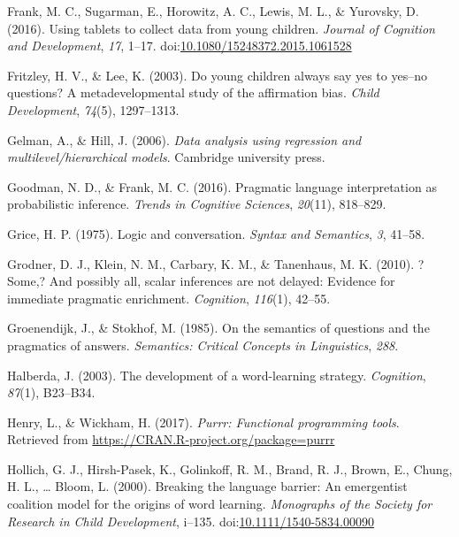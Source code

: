 \documentclass[man]{apa6}
\begin{document}
\hypertarget{ref-frank2016}{}
Frank, M. C., Sugarman, E., Horowitz, A. C., Lewis, M. L., \& Yurovsky,
D. (2016). Using tablets to collect data from young children.
\emph{Journal of Cognition and Development}, \emph{17}, 1--17.
doi:\href{https://doi.org/10.1080/15248372.2015.1061528}{10.1080/15248372.2015.1061528}

\hypertarget{ref-fritzley2003young}{}
Fritzley, H. V., \& Lee, K. (2003). Do young children always say yes to
yes--no questions? A metadevelopmental study of the affirmation bias.
\emph{Child Development}, \emph{74}(5), 1297--1313.

\hypertarget{ref-gelman2006data}{}
Gelman, A., \& Hill, J. (2006). \emph{Data analysis using regression and
multilevel/hierarchical models}. Cambridge university press.

\hypertarget{ref-goodman2016}{}
Goodman, N. D., \& Frank, M. C. (2016). Pragmatic language
interpretation as probabilistic inference. \emph{Trends in Cognitive
Sciences}, \emph{20}(11), 818--829.

\hypertarget{ref-grice1975logic}{}
Grice, H. P. (1975). Logic and conversation. \emph{Syntax and
Semantics}, \emph{3}, 41--58.

\hypertarget{ref-grodner2010}{}
Grodner, D. J., Klein, N. M., Carbary, K. M., \& Tanenhaus, M. K.
(2010). ?Some,? And possibly all, scalar inferences are not delayed:
Evidence for immediate pragmatic enrichment. \emph{Cognition},
\emph{116}(1), 42--55.

\hypertarget{ref-groenendijk1985semantics}{}
Groenendijk, J., \& Stokhof, M. (1985). On the semantics of questions
and the pragmatics of answers. \emph{Semantics: Critical Concepts in
Linguistics}, \emph{288}.

\hypertarget{ref-halberda2003development}{}
Halberda, J. (2003). The development of a word-learning strategy.
\emph{Cognition}, \emph{87}(1), B23--B34.

\hypertarget{ref-R-purrr}{}
Henry, L., \& Wickham, H. (2017). \emph{Purrr: Functional programming
tools}. Retrieved from \url{https://CRAN.R-project.org/package=purrr}

\hypertarget{ref-hollich2000}{}
Hollich, G. J., Hirsh-Pasek, K., Golinkoff, R. M., Brand, R. J., Brown,
E., Chung, H. L., \ldots{} Bloom, L. (2000). Breaking the language
barrier: An emergentist coalition model for the origins of word
learning. \emph{Monographs of the Society for Research in Child
Development}, i--135.
doi:\href{https://doi.org/10.1111/1540-5834.00090}{10.1111/1540-5834.00090}
\end{document}
